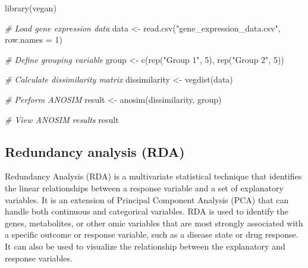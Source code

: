 \documentclass[
]{book}
\newenvironment{Shaded}{\begin{snugshade}}{\end{snugshade}}
\newcommand{\AttributeTok}[1]{\textcolor[rgb]{0.77,0.63,0.00}{#1}}
\newcommand{\CommentTok}[1]{\textcolor[rgb]{0.56,0.35,0.01}{\textit{#1}}}
\newcommand{\DecValTok}[1]{\textcolor[rgb]{0.00,0.00,0.81}{#1}}
\newcommand{\FunctionTok}[1]{\textcolor[rgb]{0.00,0.00,0.00}{#1}}
\newcommand{\NormalTok}[1]{#1}
\newcommand{\OtherTok}[1]{\textcolor[rgb]{0.56,0.35,0.01}{#1}}
\newcommand{\StringTok}[1]{\textcolor[rgb]{0.31,0.60,0.02}{#1}}
\begin{document}
\begin{Shaded}
\begin{Highlighting}[]
\FunctionTok{library}\NormalTok{(vegan)}

\CommentTok{\# Load gene expression data}
\NormalTok{data }\OtherTok{\textless{}{-}} \FunctionTok{read.csv}\NormalTok{(}\StringTok{"gene\_expression\_data.csv"}\NormalTok{, }\AttributeTok{row.names =} \DecValTok{1}\NormalTok{)}

\CommentTok{\# Define grouping variable}
\NormalTok{group }\OtherTok{\textless{}{-}} \FunctionTok{c}\NormalTok{(}\FunctionTok{rep}\NormalTok{(}\StringTok{"Group 1"}\NormalTok{, }\DecValTok{5}\NormalTok{), }\FunctionTok{rep}\NormalTok{(}\StringTok{"Group 2"}\NormalTok{, }\DecValTok{5}\NormalTok{))}

\CommentTok{\# Calculate dissimilarity matrix}
\NormalTok{dissimilarity }\OtherTok{\textless{}{-}} \FunctionTok{vegdist}\NormalTok{(data)}

\CommentTok{\# Perform ANOSIM}
\NormalTok{result }\OtherTok{\textless{}{-}} \FunctionTok{anosim}\NormalTok{(dissimilarity, group)}

\CommentTok{\# View ANOSIM results}
\NormalTok{result}
\end{Highlighting}
\end{Shaded}

\hypertarget{redundancy-analysis}{%
\subsection{Redundancy analysis (RDA)}\label{redundancy-analysis}}

Redundancy Analysis (RDA) is a multivariate statistical technique that identifies the linear relationships between a response variable and a set of explanatory variables. It is an extension of Principal Component Analysis (PCA) that can handle both continuous and categorical variables. RDA is used to identify the genes, metabolites, or other omic variables that are most strongly associated with a specific outcome or response variable, such as a disease state or drug response. It can also be used to visualize the relationship between the explanatory and response variables.
\end{document}
